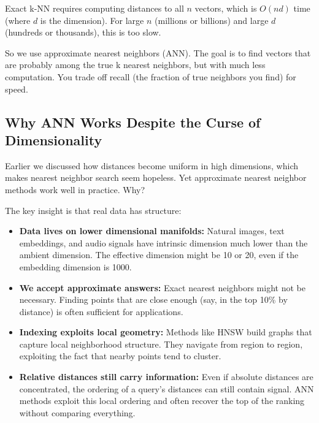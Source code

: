 Exact k-NN requires computing distances to all $n$ vectors, which is $O(nd)$ time (where $d$ is the dimension). For large $n$ (millions or billions) and large $d$ (hundreds or thousands), this is too slow.

So we use approximate nearest neighbors (ANN). The goal is to find vectors that are probably among the true k nearest neighbors, but with much less computation. You trade off recall (the fraction of true neighbors you find) for speed.

\vspace{1.5em}

\subsection{Why ANN Works Despite the Curse of Dimensionality}

Earlier we discussed how distances become uniform in high dimensions, which makes nearest neighbor search seem hopeless. Yet approximate nearest neighbor methods work well in practice. Why?

The key insight is that real data has structure:

\begin{itemize}
\item \textbf{Data lives on lower dimensional manifolds:} Natural images, text embeddings, and audio signals have intrinsic dimension much lower than the ambient dimension. The effective dimension might be 10 or 20, even if the embedding dimension is 1000.

\item \textbf{We accept approximate answers:} Exact nearest neighbors might not be necessary. Finding points that are close enough (say, in the top 10\% by distance) is often sufficient for applications.

\item \textbf{Indexing exploits local geometry:} Methods like HNSW build graphs that capture local neighborhood structure. They navigate from region to region, exploiting the fact that nearby points tend to cluster.

\item \textbf{Relative distances still carry information:} Even if absolute distances are concentrated, the ordering of a query's distances can still contain signal. ANN methods exploit this local ordering and often recover the top of the ranking without comparing everything.
\end{itemize}

\vspace{0.5em}

